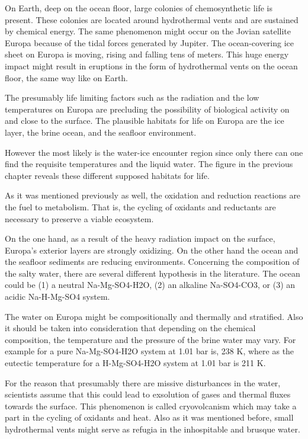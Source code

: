 On Earth, deep on the ocean floor, large colonies of chemosynthetic life is present. These colonies are located around hydrothermal vents and are sustained by chemical energy. 
The same phenomenon might occur on the Jovian satellite Europa because of the tidal forces generated by Jupiter. The ocean-covering ice sheet on Europa is moving, rising and falling tens of meters. This huge energy impact might result in eruptions in the form of hydrothermal vents on the ocean floor, the same way like on Earth.

The presumably life limiting factors such as the radiation and the low temperatures on Europa are precluding the possibility of biological activity on and close to the surface. The plausible habitats for life on Europa are the ice layer, the brine ocean, and the seafloor environment.

However the most likely is the water-ice encounter region since only there can one find  the requisite temperatures and the liquid water.
The figure in the previous chapter reveals these different supposed habitats for life.
\cite{SearchLife}



As it was mentioned previously as well, the oxidation and reduction reactions are the fuel to metabolism. That is, the cycling of oxidants and reductants are necessary to preserve a viable ecosystem.

On the one hand, as a result of the heavy radiation impact on the surface, Europa's exterior layers are strongly oxidizing. On the other hand the ocean and the seafloor sediments are reducing environments. Concerning the composition of the salty water, there are several different hypothesis in the literature. The ocean could be (1) a neutral Na-Mg-SO4-H2O, (2) an alkaline Na-SO4-CO3, or (3) an acidic Na-H-Mg-SO4 system.


The water on Europa might be compositionally and thermally and stratified. Also it should be taken into consideration that depending on the chemical composition, the temperature and the pressure of the brine water may vary. For example for a pure Na-Mg-SO4-H2O system at 1.01 bar is, 238 K, where as the eutectic temperature for a H-Mg-SO4-H2O system at 1.01 bar is 211 K. 


For the reason that presumably there are missive disturbances in the water, scientists assume that this could lead to exsolution of gases and thermal fluxes towards the surface. This phenomenon is called cryovolcanism which may take a part in the cycling of oxidants and heat. Also as it was mentioned before, small hydrothermal vents might serve as refugia in the inhospitable and brusque water.

